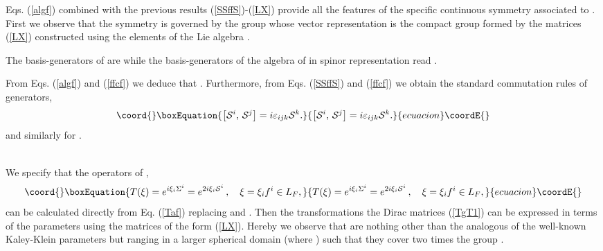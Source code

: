 \documentclass[a4paper,12pt]{article}
\begin{document}
Eqs. (\ref{algf}) combined with the previous results (\ref{SSffS})-(\ref{LX}) 
provide all the features of the specific continuous symmetry associated to 
\coordHE{}. First we observe that the symmetry is governed by the group 
\coordHE{} whose vector representation is 
the compact group \coordHE{} formed by the 
matrices (\ref{LX}) constructed using the elements of the Lie algebra 
\coordHE{}.
\begin{cor}
The basis-generators of \coordHE{} are \coordHE{} while the basis-generators 
of the \coordHE{} algebra of \coordHE{} in spinor representation read 
\coordHE{}  \coordHE{}. 
\end{cor}
\begin{demo}
From Eqs. (\ref{algf}) and (\ref{ffcf}) we deduce that 
\coordHE{}. 
Furthermore, from  Eqs. (\ref{SSffS}) and (\ref{ffcf})  
we obtain the standard commutation rules of \coordHE{} generators, 
\begin{equation}\coord{}\boxEquation{
\left[ {\cal S}^i,\,{\cal S}^j \right]=i\varepsilon_{ijk}{\cal S}^k.
}{
\left[ {\cal S}^i,\,{\cal S}^j \right]=i\varepsilon_{ijk}{\cal S}^k.
}{ecuacion}\coordE{}\end{equation}  
and similarly for  \coordHE{}.
\end{demo}\\
We specify that the operators of \coordHE{}, 
\begin{equation}\coord{}\boxEquation{\label{TxiS}
T(\xi)=e^{i\xi_i \Sigma^i} =e^{2i\xi_i {\cal S}^i}\,, 
\quad \xi=\xi_i f^i\in L_F, 
}{T(\xi)=e^{i\xi_i \Sigma^i} =e^{2i\xi_i {\cal S}^i}\,, 
\quad \xi=\xi_i f^i\in L_F, 
}{ecuacion}\coordE{}\end{equation}
can be calculated directly from Eq. (\ref{Taf}) replacing 
\coordHE{} 
and \coordHE{}. Then the transformations the Dirac
matrices (\ref{TgT1}) can be expressed in terms of the parameters \coordHE{} 
using the matrices \myHighlight{$\Lambda(\xi)$}\coordHE{} of the form (\ref{LX}). Hereby we 
observe that \coordHE{} are nothing other than the analogous of the well-known 
Kaley-Klein parameters but ranging in a larger spherical domain (where 
\myHighlight{$\|\xi\|\le 2\pi$}\coordHE{}) such that they cover two times the group 
\coordHE{}.  
\end{document}

